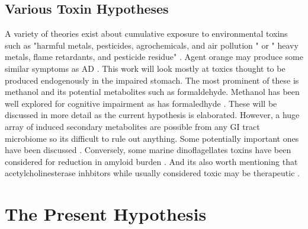 \newcommand{\mjmtoxic}{
\subsection{ Various Toxin  Hypotheses }
A variety of theories exist about cumulative exposure
to environmental toxins such as 
"harmful metals, pesticides, agrochemicals, and air pollution "
\cite{Dhapola2024}
or " heavy metals, flame retardants, and pesticide residue"
\cite{Genuis_Kelln_Toxicant_Exposure_Bioaccumulation_2015}.
Agent orange may produce some similar symptoms as AD 
\cite{delaMonte_Tong_Agent_Orange_Herbicidal_Toxin_2024}.
This work will look mostly at toxics thought to be produced 
endogenously in the impaired stomach. The most
prominent of these is methanol
 and
its potential metabolites such as formaldehyde.
Methanol has been well explored for cognitive impairment
\cite{Li_Shi_Li_Chronic_methanol_exposure_induces_2026}
as has formaledhyde 
\cite{Yang_Miao_Rizak_Alzheimer_Disease_2014}.
These will be discussed in more detail as the current hypothesis
is elaborated. 
However, a huge array of induced 
secondary metabolites are possible from
any GI tract microbiome so its difficult to rule out anything.
Some potentially important ones have been discussed
\cite{Zhao_Jaber_Lukiw_Secretory_Products_2017}.
Conversely, some marine dinoflagellates toxins have been
considered for reduction in amyloid burden
\cite{Botelho_Milinovic_Bandarra_Alzheimer_Disease_2022}.
And its also worth mentioning that acetylcholinesterase inhbitors
while usually considered toxic may be therapeutic
\cite{SINGH2013165}.
} %


\mjmdamage
\mjmgenes
\mjmtrans
\mjminfect
\mjmgba
\mjmmetabolic
\mjmnutrient
\mjmtoxic


\section{ The Present Hypothesis }


